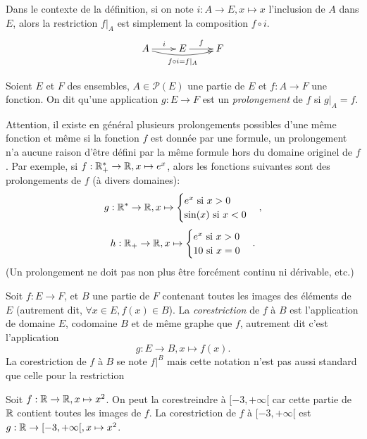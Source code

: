 \begin{remarque}
Dans le contexte de la définition, si on note $i : A\to E, x\mapsto x$ l'inclusion de $A$ dans $E$, alors la restriction $f|_A$ est simplement la composition $f\circ i$.
\[\xymatrix{
A \ar[r]^{i} \ar@/_/[rr]_{f\circ i = f|_A} & E \ar[r]^f & F
}\]
\end{remarque}

\begin{definition}[Prolongement]
Soient $E$ et $F$ des ensembles, $A\in \mathcal P(E)$ une partie de $E$ et $f : A\to F$ une fonction. On dit qu'une application $g : E\to F$ est un \emph{prolongement} de $f$ si $g|_A = f$.
\end{definition}

Attention, il existe en général plusieurs prolongements possibles d'une même fonction et même si la fonction $f$ est donnée par une formule, un prolongement n'a aucune raison d'être défini par la même formule hors du domaine originel de $f$. Par exemple, si $f : \mathbb{R}_+^* \to \mathbb{R}, x\mapsto e^x$, alors les fonctions suivantes  sont des prolongements de $f$ (à divers domaines):
\[g : \mathbb{R}^* \to \mathbb{R}, x\mapsto \begin{cases}e^x\text{ si } x>0\\ \sin(x) \text{ si } x<0\end{cases},\]
\[h : \mathbb{R}_+ \to \mathbb{R}, x\mapsto \begin{cases}e^x\text{ si } x>0\\ 10 \text{ si }x=0\end{cases}.\]
(Un prolongement ne doit pas non plus être forcément continu ni dérivable, etc.)


\begin{definition}[Corestriction]
Soit $f : E\to F$, et $B$ une partie de $F$ contenant toutes les images des éléments de $E$ (autrement dit, $\forall x\in E, f(x)\in B$).
La \emph{corestriction} de $f$ à $B$ est l'application de domaine $E$, codomaine $B$ et de même graphe que $f$, autrement dit c'est l'application 
\[ g : E\to B, x\mapsto f(x).\]
La corestriction de $f$ à $B$ se note $f|^{B}$ mais cette notation n'est pas aussi standard que celle pour la restriction
\end{definition}

\begin{exemple}
Soit $f : \mathbb{R}\to \mathbb{R}, x\mapsto x^2$. On peut la corestreindre à $[-3,+\infty[$ car cette partie de $\mathbb{R}$ contient toutes les images de $f$. La corestriction de $f$ à $[-3,+\infty[$ est $g : \mathbb{R}\to [-3,+\infty[, x\mapsto x^2$.
\end{exemple}

